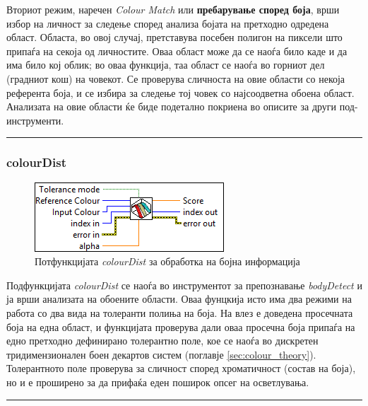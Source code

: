 \documentclass[11pt]{article}
\begin{document}
      Вториот режим, наречен \textit{Colour Match} или \textbf{пребарување според боја}, врши избор на личност за следење според анализа бојата на претходно одредена област. Областа, во овој случај, претставува посебен полигон на пиксели што припаѓа на секоја од личностите. Оваа област може да се наоѓа било каде и да има било кој облик; во оваа функција, таа област се наоѓа во горниот дел (градниот кош) на човекот. Се проверува сличноста на овие области со некоја референта боја, и се избира за следење тој човек со најсоодветна обоена област. Анализата на овие области ќе биде подетално покриена во описите за други под-инструменти.\\
      \textcolor[RGB]{150,150,150}{\rule{\linewidth}{1.6pt}}

    \subsubsection{colourDist} \label{sec:colourDist}
	    \begin{figure}[H]
	      \includegraphics[width=0.55\linewidth]{./images/colourDist_border.png}
		    \caption{Потфункцијата \textit{colourDist} за обработка на бојна информација}
	      \label{fig:colourDist.png}
	      \raggedright
	      \end{figure}
      Подфункцијата \textit{colourDist} се наоѓа во инструментот за препознавање \textit{bodyDetect} и ја врши анализата на обоените области. Оваа фунцкија исто има два режими на работа со два вида на толеранти полиња на боја. На влез е доведена просечната боја на една област, и функцијата проверува дали оваа просечна боја припаѓа на едно претходно дефинирано толерантно поле, кое се наоѓа во дискретен тридимензионален боен декартов систем (поглавје \ref{sec:colour_theory}). Толерантното поле проверува за сличност според хроматичност (состав на боја), но и е проширено за да прифаќа еден поширок опсег на осветлувања.\\
      \textcolor[RGB]{150,150,150}{\rule{\linewidth}{1.6pt}}
\end{document}
